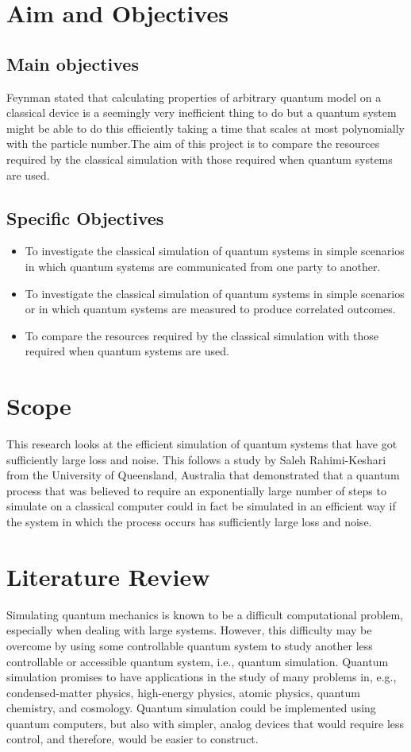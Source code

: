 \documentclass[options]{article}
\begin{document}
\section{\textbf{ Aim and Objectives}}

\subsection{Main objectives}
Feynman stated that calculating properties of arbitrary quantum model on a classical device is a seemingly very inefficient thing to do but a quantum system might be able to do this efficiently taking a time that scales at most polynomially with the particle number.The aim of this project is to compare the resources required by the classical simulation with those required when quantum systems are used.

\subsection{Specific Objectives}
\begin{itemize}
   \item  To investigate the classical simulation of quantum systems in simple scenarios in which quantum systems are communicated from one party to another.
   \item  To investigate the classical simulation of quantum systems in simple scenarios or in which quantum systems are measured to produce correlated outcomes. 
   \item To compare the resources required by the classical simulation with those required when quantum systems are used.
\end{itemize}

\section {\textbf{Scope}}
This research looks at the efficient simulation of quantum systems that have got sufficiently large loss and noise. 
This follows a study by Saleh Rahimi-Keshari from the University of Queensland, Australia that demonstrated that a quantum process that was believed to require an exponentially large number of steps to simulate on a classical computer could in fact be simulated in an efficient way if the system in which the process occurs has sufficiently large loss and noise.


\section{\textbf{Literature Review }}
Simulating quantum mechanics is known to be a difficult computational problem, especially when dealing with large systems. However, this difficulty may be overcome by using some controllable quantum system to study another less controllable or accessible quantum system, i.e., quantum simulation. 
Quantum simulation promises to have applications in the study of many problems in, e.g., condensed-matter physics, high-energy physics, atomic physics, quantum chemistry, and cosmology. Quantum simulation could be implemented using quantum computers, but also with simpler, analog devices that would require less control, and therefore, would be easier to construct. 
\end{document}
